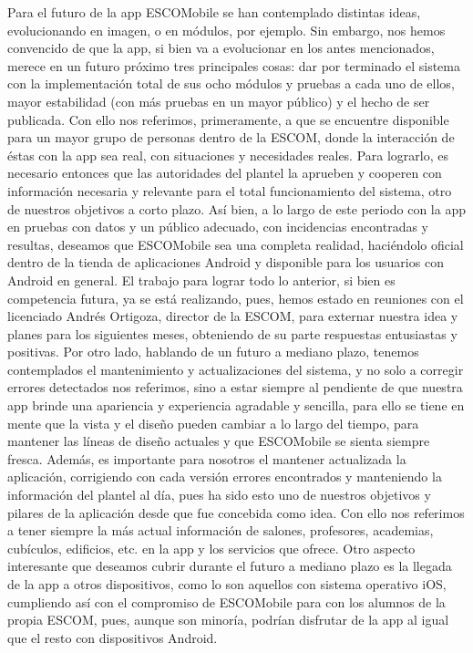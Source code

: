 \noindent
Para el futuro de la app ESCOMobile se han contemplado distintas ideas, evolucionando en imagen, o en módulos, por ejemplo. Sin embargo, nos hemos convencido de que la app, si bien va a evolucionar en los antes mencionados, merece en un futuro próximo tres principales cosas: dar por terminado el sistema con la implementación total de sus ocho módulos y pruebas a cada uno de ellos, mayor estabilidad (con más pruebas en un mayor público) y el hecho de ser publicada. Con ello nos referimos, primeramente, a que se encuentre disponible para un mayor grupo de personas dentro de la ESCOM, donde la interacción de éstas con la app sea real, con situaciones y necesidades reales. Para lograrlo, es necesario entonces que las autoridades del plantel la aprueben y cooperen con información necesaria y relevante para el total funcionamiento del sistema, otro de nuestros objetivos a corto plazo. 
\newline
Así bien, a lo largo de este periodo con la app en pruebas con datos y un público adecuado, con incidencias encontradas y resultas, deseamos que ESCOMobile sea una completa realidad, haciéndolo oficial dentro de la tienda de aplicaciones Android y disponible para los usuarios con Android en general. El trabajo para lograr todo lo anterior, si bien es competencia futura, ya se está realizando, pues, hemos estado en reuniones con el licenciado Andrés Ortigoza, director de la ESCOM, para externar nuestra idea y planes para los siguientes meses, obteniendo de su parte respuestas entusiastas y positivas.
\newline
\newline
Por otro lado, hablando de un futuro a mediano plazo, tenemos contemplados el mantenimiento y actualizaciones del sistema, y no solo a corregir errores detectados nos referimos, sino a estar siempre al pendiente de que nuestra app brinde una apariencia y experiencia agradable y sencilla, para ello se tiene en mente que la vista y el diseño pueden cambiar a lo largo del tiempo, para mantener las líneas de diseño actuales y que ESCOMobile se sienta siempre fresca. 
\newline
Además, es importante para nosotros el mantener actualizada la aplicación, corrigiendo con cada versión errores encontrados y manteniendo la información del plantel al día, pues ha sido esto uno de nuestros objetivos y pilares de la aplicación desde que fue concebida como idea. Con ello nos referimos a tener siempre la más actual información de salones, profesores, academias, cubículos, edificios, etc. en la app y los servicios que ofrece. Otro aspecto interesante que deseamos cubrir durante el futuro a mediano plazo es la llegada de la app a otros dispositivos, como lo son aquellos con sistema operativo iOS, cumpliendo así con el compromiso de ESCOMobile para con los alumnos de la propia ESCOM, pues, aunque son minoría, podrían disfrutar de la app al igual que el resto con dispositivos Android.
